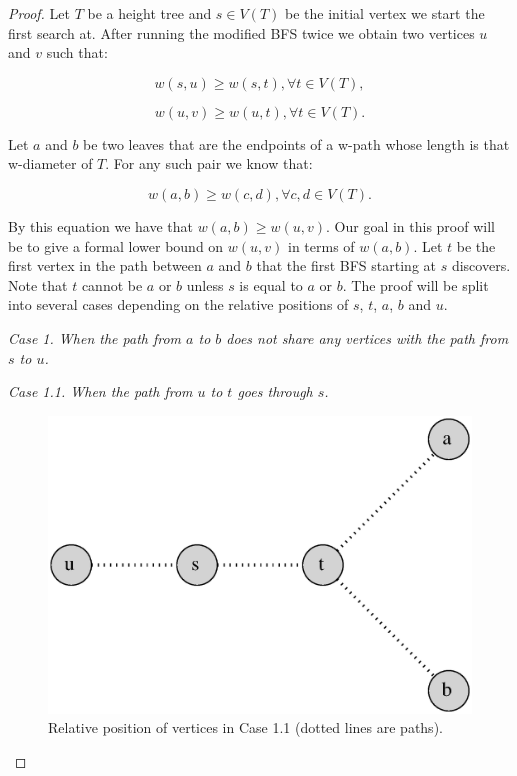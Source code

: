 \begin{proof}
Let $T$ be a height tree and $s \in V(T)$ be the initial vertex we start the first search at. After running the modified BFS twice we obtain two vertices $u$ and $v$ such that:

\begin{equation}
    \label{eq:su_all}
    w(s, u) \ge w(s, t), \forall t \in V(T),
\end{equation}

\begin{equation}
    \label{eq:uv_all}
    w(u, v) \ge w(u, t), \forall t \in V(T).
\end{equation}

Let $a$ and $b$ be two leaves that are the endpoints of a w-path whose length is that w-diameter of $T$. For any such pair we know that:

\begin{equation}
    \label{eq:ab_all}
    w(a, b) \ge w(c, d), \forall c, d \in V(T).
\end{equation}

By this equation we have that $w(a, b) \ge w(u, v)$. Our goal in this proof will be to give a formal lower bound on $w(u, v)$ in terms of $w(a, b)$. Let $t$ be the first vertex in the path between $a$ and $b$ that the first BFS starting at $s$ discovers. Note that $t$ cannot be $a$ or $b$ unless $s$ is equal to $a$ or $b$. The proof will be split into several cases depending on the relative positions of $s$, $t$, $a$, $b$ and $u$. \linebreak

{\em Case 1. When the path from $a$ to $b$ does not share any vertices with the path from $s$ to $u$.}

{\em Case 1.1. When the path from $u$ to $t$ goes through $s$.}

\begin{figure}[h]%
    \centering
    \includegraphics[center, scale=0.4]{./images/2xbfs-case-1-1.eps}
    \caption{Relative position of vertices in Case 1.1 (dotted lines are paths). }%
    \label{fig:case1.1}%
\end{figure}


\end{proof}

